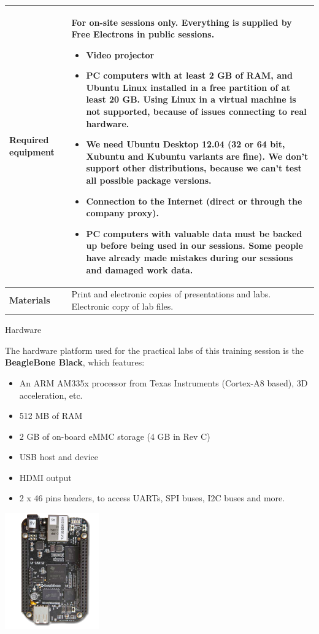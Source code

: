 \documentclass[a4paper,12pt,obeyspaces,spaces,hyphens]{article}
\begin{document}
{\begin{tabularx}{\textwidth}{|g|h|}
    {\bf Required equipment} &
    {\bf For on-site sessions only.}
    \newline Everything is supplied by Free Electrons in public
    sessions.
    \begin{itemize}
    \item Video projector
    \item PC computers with at least 2 GB of RAM, and Ubuntu Linux
    installed in a {\bf free partition of at least 20 GB. Using Linux
      in a virtual machine is not supported}, because of issues
    connecting to real hardware.
    \item We need Ubuntu Desktop 12.04 (32 or 64 bit, Xubuntu and
    Kubuntu variants are fine). We don't support other
    distributions, because we can't test all possible package versions.
    \item {\bf Connection to the Internet} (direct or through the
    company proxy).
    \item {\bf PC computers with valuable data must be backed up}
    before being used in our sessions.  Some people have already made
    mistakes during our sessions and damaged work data.
    \end{itemize} \\
    \hline

    {\bf Materials} & Print and electronic copies of presentations and
    labs.
    \newline Electronic copy of lab files.\\
    \hline

\end{tabularx}}

\feagendatwocolumn
{Hardware}
{
  The hardware platform used for the practical labs of this training
  session is the {\bf BeagleBone Black}, which features:

  \begin{itemize}
  \item An ARM AM335x processor from Texas Instruments (Cortex-A8
    based), 3D acceleration, etc.
  \item 512 MB of RAM
  \item 2 GB of on-board eMMC storage
  	\newline(4 GB in Rev C)
  \item USB host and device
  \item HDMI output
  \item 2 x 46 pins headers, to access UARTs, SPI buses, I2C buses
    and more.
  \end{itemize}
}
{}
{
  \begin{center}
    \includegraphics[height=5cm]{agenda/beagleboneblack.png}
  \end{center}
}
\end{document}
